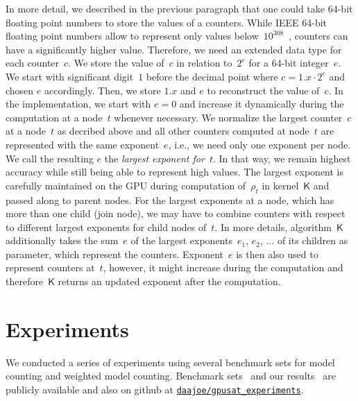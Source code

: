 \documentclass{llncs}
\newcommand{\algo}[1]{\ensuremath{\mathsf{#1}}}
\begin{document}
In more detail, we described in the previous paragraph that one could
take 64-bit floating point numbers to store the values of a
counters. While IEEE 64-bit floating point numbers allow to represent
only values below~$10^{308}$~\cite{ieee754}, counters can have a
significantly higher value.
%
Therefore, we need an extended data type for each counter~$c$. We
store the value of~$c$ in relation to~$2^{e}$ for a 64-bit integer~$e$.
%
%
%
We start with significant digit~$1$ before the decimal point where
$c=1.x \cdot 2^e$ and chosen $e$ accordingly. Then, we store $1.x$ and
$e$ to reconstruct the value of~$c$.
%
In the implementation, we start with $e = 0$ and increase it
dynamically during the computation at a node~$t$ whenever
necessary. We normalize the largest counter~$c$ at a node~$t$ as
decribed above and all other counters computed at node~$t$ are
represented with the same exponent~$e$, i.e., we need only one
exponent per node. We call the resulting $e$ the \emph{largest
  exponent for~$t$}.
%
In that way, we remain highest accuracy while still being
able to represent high values.
%
The largest exponent is carefully maintained on the GPU during
computation of~$\rho_t$ in kernel~$\algo{K}$ and passed along to
parent nodes.
%
For the largest exponents at a node, which has more than one child
(join node), we may have to combine counters with respect to different
largest exponents for child nodes of~$t$.
In more details, algorithm~\algo{K} additionally takes the sum~$e$ of the largest %
exponents~$e_1$, $e_2$, $\ldots$ of its children as parameter,
which represent the counters. %
%
Exponent~$e$ is then also used to represent counters at~$t$, however,
it might increase during the computation and therefore~\algo{K}
returns an updated exponent after the computation.

%

\section{Experiments}
\label{sec:experiments}
%
We conducted a series of experiments using several benchmark sets for
model counting and weighted model counting. Benchmark
sets~\cite{FichteEtAl18b} and our results~\cite{FichteEtAl19c} are
publicly available and also on github at
\href{https://github.com/daajoe/gpusat_experiments/tree/cp2019}{\nolinkurl{daajoe/gpusat_experiments}}.
\end{document}
